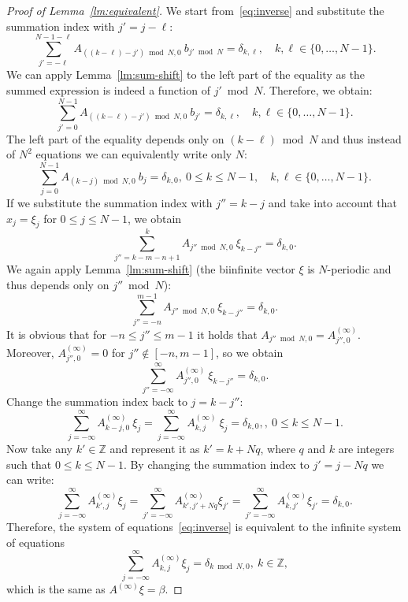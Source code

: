 \documentclass[a4paper]{article}
\newcommand{\Ainf}{A^{(\infty)}}
\begin{document}
	
	\begin{proof}[Proof of Lemma~\ref{lm:equivalent}]
	We start from~\eqref{eq:inverse} and substitute the summation index with $j' = j - \ell$:
	\[
    \sum_{j'=-\ell}^{N-1-\ell} A_{((k-\ell)- j') \bmod N, 0}~b_{j'\bmod N}
	=
	\delta_{k,\ell},\quad k,\ell \in \{0, \dots, N-1\}.
	\]
	We can apply Lemma~\ref{lm:sum-shift} to the left part of the equality as the summed expression is indeed a function of $j' \bmod N$.
    Therefore, we obtain:
	\[
	\sum_{j'=0}^{N-1} A_{((k-\ell)- j') \bmod N, 0}~b_{j'}
	=
	\delta_{k,\ell},\quad k,\ell \in \{0, \dots, N-1\}.
	\]
	The left part of the equality depends only on $(k-\ell) \bmod N$ and thus instead of $N^2$ equations we can equivalently write only $N$:
	\[
	\sum_{j=0}^{N-1} A_{(k-j) \bmod N, 0}~b_j
	=
	\delta_{k,0},~ 0\le k \le N-1,\quad k,\ell \in \{0, \dots, N-1\}.
	\]
	If we substitute the summation index with $j'' = k-j$ and take into account that $x_j = \xi_{j}$ for $0\le j \le N-1$, we obtain
	\[
	\sum_{j''=k-m-n+1}^{k} A_{j'' \bmod N, 0}~\xi_{k-j''} = \delta_{k,0}.
	\]
	We again apply Lemma~\ref{lm:sum-shift} (the biinfinite vector $\xi$  is $N$-periodic and thus depends only on $j'' \bmod N$):
	\[
	\sum_{j''=-n}^{m-1}A_{j'' \bmod N, 0}~\xi_{k-j''} = \delta_{k,0}.
	\]
	It is obvious that for $-n \le j'' \le m-1$ it holds that $A_{j'' \bmod N,0} = \Ainf_{j'', 0}$.
	Moreover, $\Ainf_{j'', 0} = 0$ for $j'' \not\in [-n,m-1]$, so we obtain
	\[
	\sum_{j''=-\infty}^{\infty}\Ainf_{j'',0}~\xi_{k-j''} = \delta_{k,0}.
	\]
	Change the summation index back to $j = k-j''$:
	\[
	\sum_{j=-\infty}^{\infty}\Ainf_{k-j,0}~\xi_{j}
	=
	\sum_{j=-\infty}^{\infty}\Ainf_{k,j}~\xi_{j}
	=
	\delta_{k,0},
	,~ 0\le k \le N-1.
	\]
	Now take any $k' \in \mathbb{Z}$ and represent it as $k' = k + Nq$, where $q$ and $k$ are integers such that $0 \le k \le N-1$.
	By changing the summation index to $j' = j - Nq$ we can write:
	\[
	\sum_{j=-\infty}^{\infty}\Ainf_{k',j}\xi_{j}
    =
    \sum_{j'=-\infty}^{\infty}\Ainf_{k',j'+Nq}\xi_{j'}
    =
    \sum_{j'=-\infty}^{\infty}\Ainf_{k,j'}\xi_{j'}
    =
    \delta_{k,0}.
    \]
    Therefore, the system of equations~\eqref{eq:inverse} is equivalent to the infinite system of equations
    \[
    \sum_{j=-\infty}^{\infty}\Ainf_{k,j}\xi_{j} = \delta_{k\bmod N,0},~k\in\mathbb{Z},
    \]
    which is the same as $\Ainf\xi = \beta$.
	\end{proof}
\end{document}

